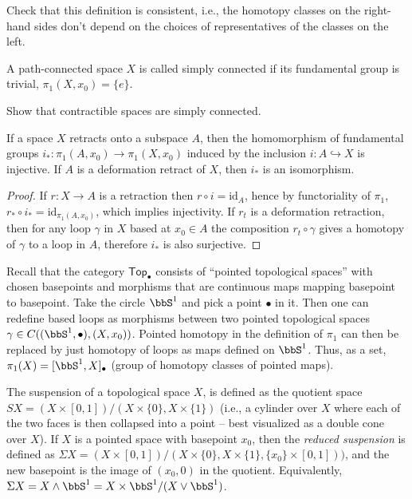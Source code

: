 \begin{xca}
    Check that this definition is consistent, i.e., the homotopy classes on the right-hand sides don't depend on the choices of representatives of the classes on the left.
\end{xca}
\begin{defn}
    A path-connected space $X$ is called simply connected if its fundamental group is trivial, $\pi_1(X,x_0)=\{e\}$.
\end{defn}

\begin{xca}
Show that contractible spaces are simply connected.
\end{xca}

\begin{thm}
    If a space $X$ retracts onto a subspace $A$, then the homomorphism of fundamental groups $i_\ast:\pi_1(A,x_0)\to \pi_1(X,x_0)$ induced by the inclusion $i: A\hookrightarrow X$ is injective. If $A$ is a deformation retract of $X$, then $i_\ast$ is an isomorphism.
\end{thm}
\begin{proof}
    If $r:X\to A$ is a retraction then $r\circ i=\mathrm{id}_A$, hence by functoriality of $\pi_1$, $r_\ast \circ i_\ast=\mathrm{id}_{\pi_1(A,x_0)}$, which implies injectivity. If $r_t$ is a deformation retraction, then for any loop $\gamma$ in $X$ based at $x_0\in A$ the composition $r_t\circ \gamma$ gives a homotopy of $\gamma$ to a loop in $A$, therefore $i_\ast$ is also surjective.
\end{proof}

\begin{defn}
    Recall that the category $\mathsf{Top}_\bullet$ consists of ``pointed topological spaces'' with chosen basepoints and morphisms that are continuous maps mapping basepoint to basepoint. Take the circle $\bbS^1$ and pick a point $\bullet$ in it. Then one can redefine based loops as morphisms between two pointed topological spaces $\gamma\in C((\bbS^1,\bullet),(X,x_0))$. Pointed homotopy in the definition of $\pi_1$ can then be replaced by just homotopy of loops as maps defined on $\bbS^1$.   Thus, as a set, $\pi_1(X)=[\bbS^1,X]_\bullet$ (group of homotopy classes of pointed maps).
\end{defn}

\begin{defn}[Suspension]
    The suspension of a topological space $X$, is defined as the quotient space $SX=(X\times [0,1])/(X\times \{0\},X\times\{1\})$ (i.e., a cylinder over $X$ where each of the two faces is then collapsed into a point -- best visualized as a double cone over $X$). If $X$ is a pointed space with basepoint $x_0$, then the \emph{reduced suspension} is defined as $\Sigma X=(X\times [0,1])/(X\times \{0\},X\times\{1\} ,\{x_0\}\times [0,1]))$, and the new basepoint is the image of $(x_0,0)$ in the quotient. Equivalently, $\Sigma X=X\wedge \bbS^1=X\times \bbS^1/(X\vee \bbS^1)$.
\end{defn}

